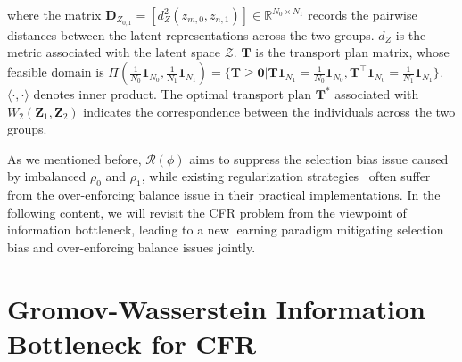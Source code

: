 \documentclass{article}
\begin{document}
where the matrix $\bm{D}_{Z_{0,1}}=[d_{Z}^2(z_{m,0},z_{n,1})]\in\mathbb{R}^{N_0\times N_1}$ records the pairwise distances between the latent representations across the two groups.
$d_Z$ is the metric associated with the latent space $\mathcal{Z}$.
$\bm{T}$ is the transport plan matrix, whose feasible domain is $\Pi(\frac{1}{N_0}\bm{1}_{N_0},\frac{1}{N_1}\bm{1}_{N_1})=\{\bm{T}\geq \bm{0}|\bm{T1}_{N_1}=\frac{1}{N_0}\bm{1}_{N_0},\bm{T}^{\top}\bm{1}_{N_0}=\frac{1}{N_1}\bm{1}_{N_1}\}$. 
$\langle\cdot,\cdot\rangle$ denotes inner product. 
The optimal transport plan $\bm{T}^*$ associated with $W_2(\bm{Z}_1,\bm{Z}_2)$ indicates the correspondence between the individuals across the two groups.

As we mentioned before, $\mathcal{R}(\phi)$ aims to suppress the selection bias issue caused by imbalanced $\rho_0$ and $\rho_1$, while existing regularization strategies~\cite{shalit2017estimating,li2022deep} often suffer from the over-enforcing balance issue in their practical implementations. 
In the following content, we will revisit the CFR problem from the viewpoint of information bottleneck, leading to a new learning paradigm mitigating selection bias and over-enforcing balance issues jointly.


\section{Gromov-Wasserstein Information Bottleneck for CFR}\label{sec:method}
\end{document}
